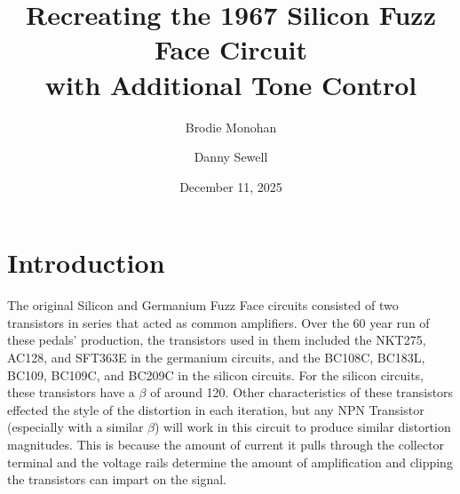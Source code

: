 \documentclass[11pt,twocolumn]{article}
\begin{document}
\title{\textbf{Recreating the 1967 Silicon Fuzz Face Circuit\\ with Additional Tone Control}}
\author{Brodie Monohan}
\author{Danny Sewell}

\date{December 11, 2025}


\section{Introduction}

The original Silicon and Germanium Fuzz Face circuits consisted of two transistors in series that acted as common amplifiers. Over the 60 year run of these pedals' production, the transistors used in them included the NKT275, AC128, and SFT363E in the germanium circuits, and the BC108C, BC183L, BC109, BC109C, and BC209C in the silicon circuits. For the silicon circuits, these transistors have a $\beta$ of around 120. Other characteristics of these transistors effected the style of the distortion in each iteration, but any NPN Transistor (especially with a similar $\beta$) will work in this circuit to produce similar distortion magnitudes. This is because the amount of current it pulls through the collector terminal and the voltage rails determine the amount of amplification and clipping the transistors can impart on the signal. 
\end{document}
